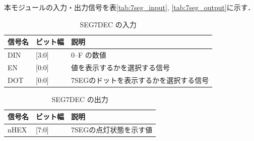 本モジュールの入力・出力信号を表\ref{tab:7seg_input}, \ref{tab:7seg_output}に示す．
\begin{table}[h]
  \caption{SEG7DEC の入力}
  \centering
  \begin{tabular}{l|l|l}
    信号名 & ビット幅 & 説明 \\
    \hline
    DIN & [3:0] & 0--F の数値 \\
    EN & [0:0] & 値を表示するかを選択する信号 \\
    DOT & [0:0] & 7SEGのドットを表示するかを選択する信号 \\
  \end{tabular}
  \label{tab:ma_input}
\end{table}
\begin{table}[h]
  \caption{SEG7DEC の出力}
  \centering
  \begin{tabular}{l|l|l}
    信号名 & ビット幅 & 説明 \\
    \hline
    nHEX & [7:0] & 7SEGの点灯状態を示す値 \\
  \end{tabular}
  \label{tab:ma_output}
\end{table}


